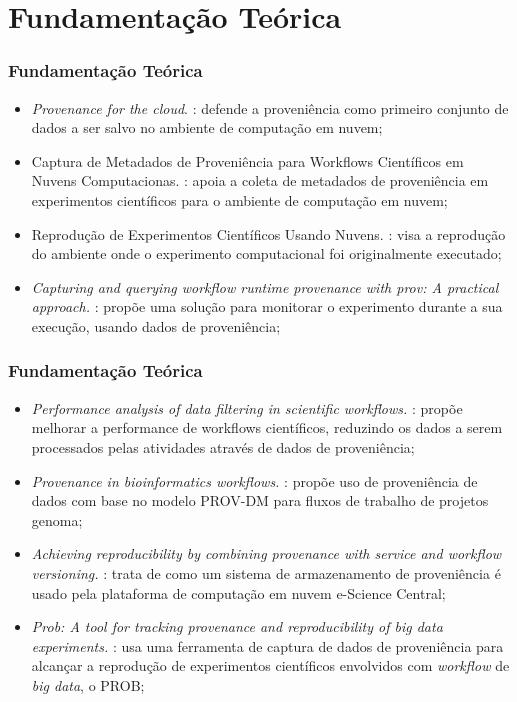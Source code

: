 \documentclass{beamer}
\begin{document}
\section{Fundamenta\c{c}\~ao Te\'orica}


\begin{frame}
\frametitle{Fundamenta\c{c}\~ao Te\'orica}
\begin{itemize}
\item \textit{Provenance for the cloud}. \cite{p11}: defende a proveni\^encia como primeiro conjunto de dados a ser
  salvo no ambiente de computa\c{c}\~ao em nuvem;
\item Captura de Metadados de Proveni\^encia para Workflows
  Cient\'ificos em Nuvens Computacionas.  \cite{p12}: apoia a coleta de metadados de proveni\^encia em experimentos
  cient\'ificos para o ambiente de computa\c{c}\~ao em nuvem;
\item Reprodu\c{c}\~ao de Experimentos Cient\'ificos Usando
  Nuvens. \cite{p13}: visa a reprodu\c{c}\~ao do ambiente onde o
  experimento computacional foi originalmente executado;
\item \textit{Capturing and querying workflow runtime provenance with
    prov: A practical approach.} \cite{p14}: prop\~oe uma
  solu\c{c}\~ao para monitorar o experimento durante a sua
  execu\c{c}\~ao, usando dados de proveni\^encia;
\end{itemize}
\end{frame}


\begin{frame}
\frametitle{Fundamenta\c{c}\~ao Te\'orica}
\begin{itemize}
\item \textit{Performance analysis of data filtering in scientific
    workflows.} \cite{p15}: prop\~oe melhorar a performance de workflows cient\'ificos,
  reduzindo os dados a serem processados pelas atividades atrav\'es de
  dados de proveni\^encia;
\item \textit{Provenance in bioinformatics workflows.} \cite{p10}: prop\~oe uso de proveni\^encia de dados com base no modelo
  PROV-DM para fluxos de trabalho de projetos genoma;
\item \textit{Achieving reproducibility by combining provenance with
    service and workflow versioning.} \cite{p16}: trata de como um sistema de armazenamento de proveni\^encia \'e
  usado pela plataforma de computa\c{c}\~ao em nuvem e-Science
  Central;
\item \textit{Prob: A tool for tracking provenance and reproducibility
    of big data experiments.} \cite{p17}: usa uma ferramenta de captura de dados de proveni\^encia para
  alcan\c{c}ar a reprodu\c{c}\~ao de experimentos cient\'ificos
  envolvidos com \textit{workflow} de \textit{big data}, o PROB;
\end{itemize}
\end{frame}
\end{document}
